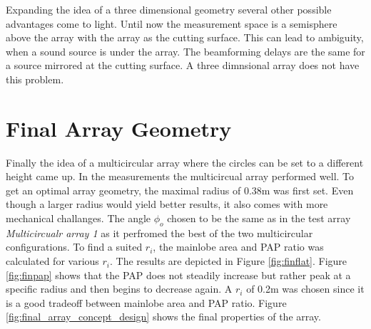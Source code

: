 Expanding the idea of a three dimensional geometry several other
possible advantages come to light.
Until now the measurement space is a semisphere above the array with the array as the cutting surface.
This can lead to ambiguity, when a sound source is under the array.
The beamforming delays are the same for a source mirrored at the cutting surface.
A three dimnsional array does not have this problem.



\newpage
\section{Final Array Geometry} \label{sec:final_array_geometry}
Finally the idea of a multicircular array where the circles can be 
set to a different height came up.
In the measurements the multicircual array performed well. 
To get an optimal array geometry, the maximal radius of 0.38m was first set.
Even though a larger radius would yield better results, it also
comes with more mechanical challanges.
The angle $\phi_o$ chosen to be the same as in the test array
\textit{Multicircualr array 1} as it perfromed the best of the two multicircular 
configurations.
To find a suited $r_i$, the mainlobe area and PAP ratio was calculated for
various $r_i$.
The results are depicted in Figure \ref*{fig:finflat}.
Figure \ref{fig:finpap} shows that the PAP does not 
steadily increase but rather peak at a specific radius and then
begins to decrease again.
A $r_i$ of 0.2m was chosen since it is a good tradeoff between 
mainlobe area and PAP ratio.
Figure \ref*{fig:final_array_concept_design} shows the final
properties of the array.

